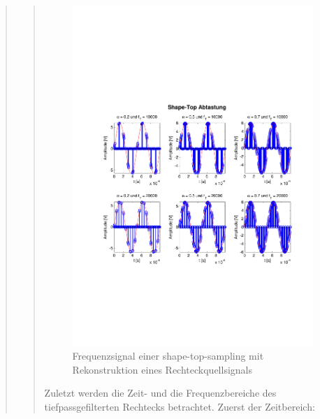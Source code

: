 \begin{quote}
\begin{quote}
        	
        	\begin{figure}[H]
            \centering
            \includegraphics[scale=0.6, trim = 1.5cm 6cm 1cm 8cm,
            clip]{./Bilder/shape-top-zeit_3V}
                \caption{Frequenzsignal einer shape-top-sampling mit Rekonstruktion
                eines Rechteckquellsignals}
      	    \end{figure}
      	    
        
        
        	Zuletzt werden die Zeit- und die Frequenzbereiche des tiefpassgefilterten
        	Rechtecks betrachtet. Zuerst der Zeitbereich:
        	

\end{quote}
\end{quote}
